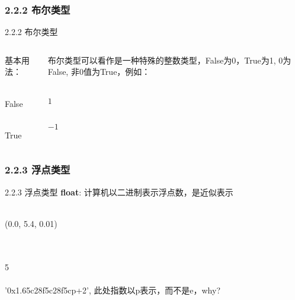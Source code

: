 \subsubsection{2.2.2 布尔类型}
\begin{frame}[fragile]{2.2.2 布尔类型}
  ~ \\
  \begin{columns}
    \begin{column}{.3\textwidth}
      基本用法：



       \\
      False 

       \\
      True 
    \end{column}
    \pause
    \begin{column}{.6\textwidth}
      布尔类型可以看作是一种特殊的整数类型，False为0，True为1,
      0为False, 非0值为True，例如：

      \vspace{0.5cm}
       \\ $1$

       \\ $-1$
    \end{column}
  \end{columns}
\end{frame}


\subsubsection{2.2.3 浮点类型}
\begin{frame}[fragile]{2.2.3 浮点类型}
  \textbf{float}:  计算机以二进制表示浮点数，是近似表示
  
   \\
  (0.0, 5.4, 0.01)
  

   \\
   \\5 \\    
  \\'0x1.65c28f5c28f5cp+2', 此处指数以p表示，而不是e，why? \\
\end{frame}

